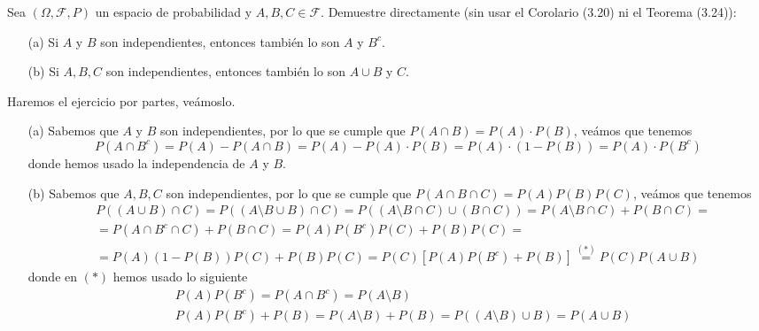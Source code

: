 \begin{ejercicio}[Libro 3.6]
    Sea $(\Omega, \mathcal{F}, P)$ un espacio de probabilidad y $A, B, C \in \mathcal{F}$. 
    Demuestre directamente (sin usar el Corolario (3.20) ni el Teorema (3.24)):
    
    \begin{enumerate}
        \item[(a)] Si $A$ y $B$ son independientes, entonces también lo son $A$ y $B^c$.
        \item[(b)] Si $A, B, C$ son independientes, entonces también lo son $A \cup B$ y $C$.
    \end{enumerate}
    Haremos el ejercicio por partes, veámoslo.
    \begin{itemize}
        \item [(a)] Sabemos que $A$ y $B$ son independientes, por lo que se cumple que $P(A \cap B) = P(A) \cdot P(B)$, veámos que tenemos
        \begin{equation*}
            P(A \cap B^c) = P(A) - P(A \cap B) = P(A) - P(A) \cdot P(B) = P(A) \cdot (1 - P(B)) = P(A) \cdot P(B^c)
        \end{equation*}
        donde hemos usado la independencia de $A$ y $B$.
        \item [(b)] Sabemos que $A, B, C$ son independientes, por lo que se cumple que $P(A \cap B \cap C) = P(A) P(B) P(C)$, veámos que tenemos
        \begin{align*}
            & P((A \cup B) \cap C) = P((A\setminus B \cup B) \cap C)= P((A \setminus B \cap C) \cup (B \cap C)) = P(A \setminus B \cap C) + P(B \cap C) = \\
            & = P(A \cap B^c \cap C) + P(B \cap C) = P(A)P(B^c)P(C) + P(B)P(C) = \\
            & = P(A)(1 - P(B))P(C) + P(B)P(C) = P(C)[P(A)P(B^c) + P(B)] \overset{(*)}{=} P(C)P(A \cup B)
        \end{align*}
        donde en $(*)$ hemos usado lo siguiente
        \begin{align*}
            & P(A)P(B^c) =P(A\cap B^c)=P(A\setminus B) \\
            & P(A)P(B^c) + P(B) = P(A\setminus B) + P(B) = P((A\setminus B) \cup B) = P(A \cup B)
        \end{align*}
    \end{itemize}
\end{ejercicio}


\begin{ejercicio}[Libro 3.10]
\end{ejercicio}

